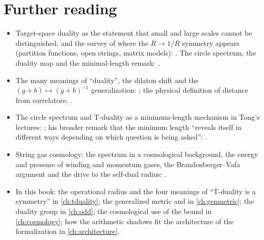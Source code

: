 \section*{Further reading}
\begin{itemize}[leftmargin=*]
\item Target-space duality as the statement that small and large scales cannot be
 distinguished, and the survey of where the $R\to1/R$ symmetry appears (partition functions,
 open strings, matrix models): . The circle spectrum, the duality
 map and the minimal-length remark: .
\item The many meanings of ``duality'', the dilaton shift and the $(g+b)\mapsto(g+b)^{-1}$
 generalization: ; the physical definition of distance from
 correlators: .
\item The circle spectrum and T-duality as a minimum-length mechanism in Tong's lectures:
 ; his broader remark that the minimum length ``reveals
 itself in different ways depending on which question is being asked'':
 .
\item String gas cosmology: the spectrum in a cosmological background, the energy and pressure
 of winding and momentum gases, the Brandenberger--Vafa argument and the drive to the self-dual
 radius: .
\item In this book: the operational radius and the four meanings of ``T-duality is a
 symmetry'' in \cref{ch:tduality}; the generalized metric and  in
 \cref{ch:genmetric}; the duality group in \cref{ch:odd}; the cosmological use of the bound in
 \cref{ch:cosmology}; how the arithmetic shadows fit the architecture of the formalization in
 \cref{ch:architecture}.
\end{itemize}
